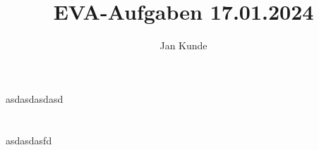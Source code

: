 \documentclass[12pt]{article}
\title{EVA-Aufgaben 17.01.2024}
\author{Jan Kunde}
\begin{document}
\maketitle
\section{}
\subsection{}
asdasdasdasd
\section{}
asdasdasfd
\section{}
\end{document}
